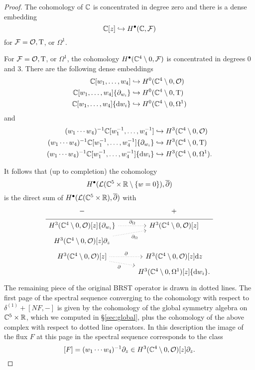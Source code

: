 \begin{proof}
The cohomology of $\mathbb C$ is concentrated in degree zero and there is a dense embedding
\[
\mathbb C[z] \hookrightarrow H^\bullet(\mathbb C, \mathcal F) 
\]
for $\mathcal F = \mathcal O, {\rm T}$, or $\Omega^1$. 

For $\mathcal F = \mathcal O, {\rm T}$, or $\Omega^1$, the cohomology $H^\bullet(\mathbb C^4 \setminus 0, \mathcal F)$ is concentrated in degrees $0$ and $3$. 
There are the following dense embeddings 
\begin{align*}
\mathbb C[w_1,\ldots, w_4] & \hookrightarrow H^0(\mathbb C^4 \setminus 0, \mathcal O) \\ 
\mathbb C[w_1,\ldots, w_4] \{\partial_{w_i}\} & \hookrightarrow H^0(\mathbb C^4 \setminus 0, {\rm T}) \\
\mathbb C[w_1,\ldots, w_4] \{{\rm d} w_i\} & \hookrightarrow H^0(\mathbb C^4 \setminus 0, \Omega^1) 
\end{align*}
and
\begin{align*}
(w_1\cdots w_4)^{-1} \mathbb C[w_1^{-1},\ldots, w_4^{-1}] & \hookrightarrow H^3(\mathbb C^4 \setminus 0, \mathcal O) \\ 
(w_1\cdots w_4)^{-1} \mathbb C[w_1^{-1},\ldots, w_4^{-1}] \{\partial_{w_i}\} & \hookrightarrow H^3(\mathbb C^4 \setminus 0, {\rm T}) \\
(w_1\cdots w_4)^{-1} \mathbb C[w_1^{-1},\ldots, w_4^{-1}] \{{\rm d} w_i\} & \hookrightarrow H^3(\mathbb C^4 \setminus 0, \Omega^1) .
\end{align*}

It follows that (up to completion) the cohomology 
\[
H^\bullet(\mathcal L(\mathbb C^5 \times \mathbb R \setminus \{w=0\}) , \overline{\partial})
\]
is the direct sum of $H^\bullet(\mathcal L(\mathbb C^5 \times \mathbb R), \overline{\partial})$ with 
\begin{equation}
  \label{eqn:ads4ss2} 
  \begin{tikzcd}[row sep = 1 ex]
    - & + \\ \hline
H^3(\CC^4\setminus 0, \cO)[z] \{\partial_{w_i}\}  \ar[r, dotted, "\div"] & H^3(\CC^4 \setminus 0, \cO) [z] \\
H^3(\CC^4\setminus 0, \cO) [z] \partial_z \ar[ur, dotted, "\div"'] \\
H^3(\CC^4\setminus 0, \cO) [z] \ar[r, dotted, "\del"] \ar[dr, dotted, "\del"'] & H^3(\CC^4\setminus 0, \cO)[z] \d z \\ & H^3(\CC^4\setminus 0, \Omega^1)[z] \{\d w_i\} .
\end{tikzcd}
\end{equation}
The remaining piece of the original BRST operator is drawn in dotted lines. 
The first page of the spectral sequence converging to the cohomology with respect to $\delta^{(1)} + [N F, -]$ is given by the cohomology of the global symmetry algebra on $\mathbb C^5 \times \mathbb R$, which we computed in \S \ref{sec:global}, plus the cohomology of the above complex with respect to dotted line operators. 
In this description the image of the flux $F$ at this page in the spectral sequence corresponds to the class 
\[
[F] = (w_1 \cdots w_4)^{-1} \partial_z \in H^3(\mathbb C^4\setminus 0, \mathcal O) [z] \partial_z .
\]


\end{proof}
